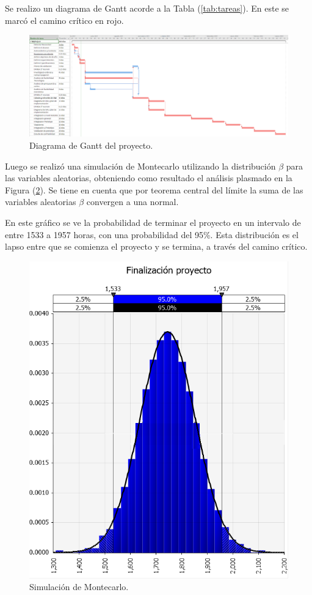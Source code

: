 Se realizo un diagrama de Gantt acorde a la Tabla (\ref{tab:tareas}). En este se marcó el camino crítico en rojo.
\begin{figure}[H]
	\centering
	\includegraphics[width=1\linewidth]{ImagenesFactibilidad/project}
	\caption{Diagrama de Gantt del proyecto.}							\label{fig:gantt}
\end{figure}

Luego se realizó una simulación de Montecarlo utilizando la distribución $\beta$ para las variables aleatorias, obteniendo como resultado el análisis plasmado en la Figura (\ref{fig:montecarlo_tiempos}). Se tiene en cuenta que por teorema central del límite la suma de las variables aleatorias $\beta$ convergen a una normal.

En este gráfico se ve la probabilidad de terminar el proyecto en un intervalo de entre 1533 a 1957 horas, con una probabilidad del 95\%. Esta distribución es el lapso entre que se comienza el proyecto y se termina, a través del camino crítico.

\begin{figure}[H]
	\centering
	\includegraphics[width=0.5\linewidth]{ImagenesFactibilidad/montecarlo}
	\caption{Simulación de Montecarlo.}	
	\label{fig:montecarlo_tiempos}
\end{figure}


